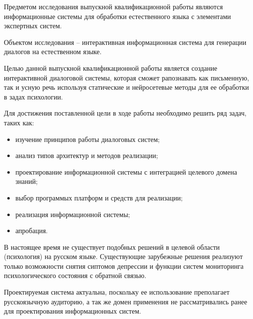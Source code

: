 Предметом исследования выпускной квалификационной работы являются информационные системы для обработки естественного языка с элементами экспертных систем. 

Объектом исследования – интерактивная информационная система для генерации диалогов на естественном языке. 

Целью данной выпускной квалификационной работы является создание интерактивной диалоговой системы, которая сможет рапознавать как письменную, так и усную речь используя статические и нейросетевые методы для ее обработки в задах психологии.

Для достижения поставленной цели в ходе работы необходимо решить ряд задач, таких как: 
\begin{itemize}
\item изучение принципов работы диалоговых систем;
\item анализ типов архитектур и методов реализации;
\item проектирование информационной системы с интеграцией целевого домена знаний; 
\item выбор программых платформ и средств для реализации;
\item реализация информационной системы;
\item апробация.
\end{itemize}

В настоящее время не существует подобных решений в целевой области (психология) на русском языке. Существующие зарубежные решения реализуют только возможности снятия сиптомов депрессии и функции систем мониторинга психологического состояния с обратной связью. 

Проектируемая система актуальна, поскольку ее использование преполагает русскоязычную аудиторию, а так же домен применения не рассматривались ранее для проектирования информационных систем. 